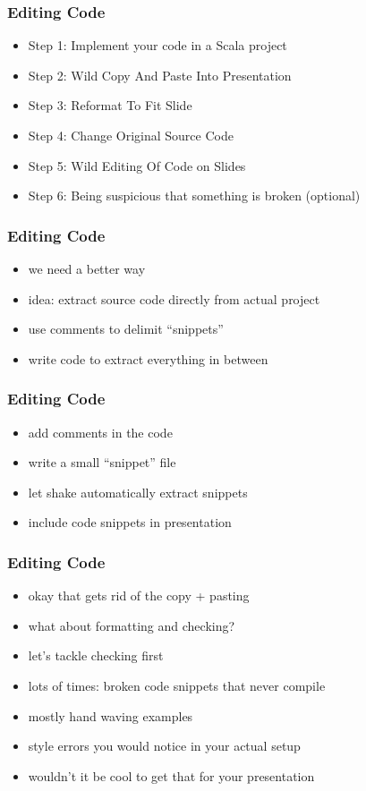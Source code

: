 \documentclass{beamer}
\begin{document}
\begin{frame}
  \frametitle{Editing Code}
  \begin{itemize}
  \item Step 1: Implement your code in a Scala project
  \item Step 2: Wild Copy And Paste Into Presentation
  \item Step 3: Reformat To Fit Slide
  \item Step 4: Change Original Source Code
  \item Step 5: Wild Editing Of Code on Slides
  \item Step 6: Being suspicious that something is broken (optional)
  \end{itemize}
\end{frame}

\begin{frame}
  \frametitle{Editing Code}
  \begin{itemize}
  \item we need a better way
  \item idea: extract source code directly from actual project
  \item use comments to delimit ``snippets''
  \item write code to extract everything in between
  \end{itemize}
\end{frame}

\begin{frame}
  \frametitle{Editing Code}
  \begin{itemize}
  \item add comments in the code
  \item write a small ``snippet'' file
  \item let shake automatically extract snippets
  \item include code snippets in presentation
  \end{itemize}
\end{frame}

\begin{frame}
  \frametitle{Editing Code}
  \begin{itemize}
  \item okay that gets rid of the copy + pasting
  \item what about formatting and checking?
  \item let's tackle checking first
  \item lots of times: broken code snippets that never compile
  \item mostly hand waving examples
  \item style errors you would notice in your actual setup
  \item wouldn't it be cool to get that for your presentation
  \end{itemize}
\end{frame}
\end{document}
